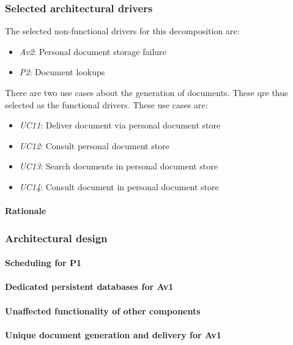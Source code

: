 \documentclass[a4paper,10pt]{article}
\begin{document}
\subsubsection{Selected architectural drivers}
The selected non-functional drivers for this decomposition are:

\begin{itemize}
	\item \emph{Av2}: Personal document storage failure
	\item \emph{P2}: Document lookups
\end{itemize}

There are two use cases about the generation of documents. These qre thus selected as the functional drivers. These use cases are:

\begin{itemize}
	\item \emph{UC11}: Deliver document via personal document store
	\item \emph{UC12}: Consult personal document store
	\item \emph{UC13}: Search documents in personal document store
	\item \emph{UC14}: Consult document in personal document store
\end{itemize}

\paragraph{Rationale}

\subsubsection{Architectural design}
\paragraph{Scheduling for P1}


\paragraph{Dedicated persistent databases for Av1}


\paragraph{Unaffected functionality of other components}


\paragraph{Unique document generation and delivery for Av1}
\end{document}
